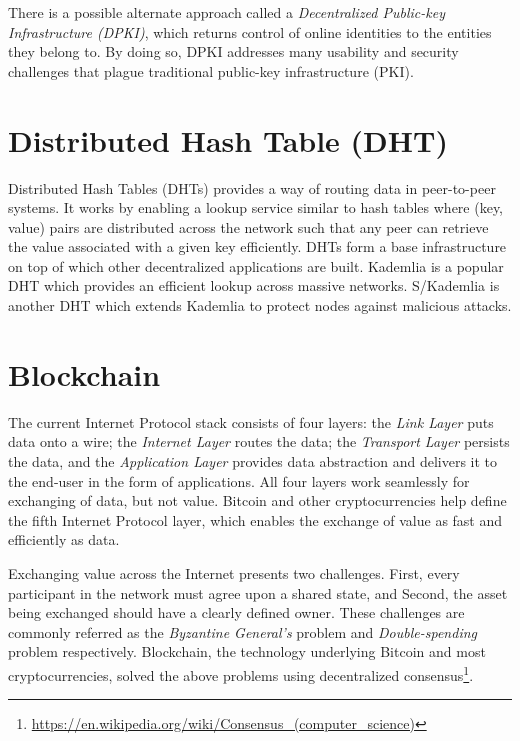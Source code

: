 	There is a possible alternate approach called a \textit{Decentralized Public-key Infrastructure (DPKI)}, which returns control of online identities to the entities they belong to. By doing so, DPKI addresses many usability and security challenges that plague traditional public-key infrastructure (PKI)\cite{allen2015decentralized}.
	
\section{Distributed Hash Table (DHT)}
	Distributed Hash Tables (DHTs)\cite{galuba2009distributed} provides a way of routing data in peer-to-peer systems. It works by enabling a lookup service similar to hash tables where (key, value) pairs are distributed across the network such that any peer can retrieve the value associated with a given key efficiently. DHTs form a base infrastructure on top of which other decentralized applications are built. Kademlia\cite{maymounkov2002kademlia} is a popular DHT which provides an efficient lookup across massive networks. S/Kademlia\cite{baumgart2007s} is another DHT which extends Kademlia to protect nodes against malicious attacks.

\section{Blockchain}
	The current Internet Protocol stack consists of four layers: the \textit{Link Layer} puts data onto a wire; the \textit{Internet Layer} routes the data; the \textit{Transport Layer} persists the data, and the \textit{Application Layer} provides data abstraction and delivers it to the end-user in the form of applications. All four layers work seamlessly for exchanging of data, but not value. Bitcoin\cite{nakamoto2008bitcoin} and other cryptocurrencies help define the fifth Internet Protocol layer, which enables the exchange of value as fast and efficiently as data\cite{raval2016decentralized}.
	
	Exchanging value across the Internet presents two challenges. First, every participant in the network must agree upon a shared state, and Second, the asset being exchanged should have a clearly defined owner. These challenges are commonly referred as the \textit{Byzantine General's} problem\cite{lamport1982byzantine} and \textit{Double-spending} problem\cite{chohan2017double} respectively. Blockchain, the technology underlying Bitcoin and most cryptocurrencies, solved the above problems using decentralized consensus\footnote{\url{https://en.wikipedia.org/wiki/Consensus_(computer_science)}}.
	
